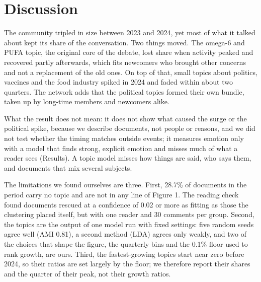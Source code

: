 \section*{Discussion}
The community tripled in size between 2023 and 2024, yet most of what it talked about kept its share of the conversation. Two things moved. The omega-6 and PUFA topic, the original core of the debate, lost share when activity peaked and recovered partly afterwards, which fits newcomers who brought other concerns and not a replacement of the old ones. On top of that, small topics about politics, vaccines and the food industry spiked in 2024 and faded within about two quarters. The network adds that the political topics formed their own bundle, taken up by long-time members and newcomers alike.

What the result does not mean: it does not show what caused the surge or the political spike, because we describe documents, not people or reasons, and we did not test whether the timing matches outside events; it measures emotion only with a model that finds strong, explicit emotion and misses much of what a reader sees (Results). A topic model misses how things are said, who says them, and documents that mix several subjects.

The limitations we found ourselves are three. First, 28.7\% of documents in the period carry no topic and are not in any line of Figure 1. The reading check found documents rescued at a confidence of 0.02 or more as fitting as those the clustering placed itself, but with one reader and 30 comments per group. Second, the topics are the output of one model run with fixed settings: five random seeds agree well (AMI 0.81), a second method (LDA) agrees only weakly, and two of the choices that shape the figure, the quarterly bins and the 0.1\% floor used to rank growth, are ours. Third, the fastest-growing topics start near zero before 2024, so their ratios are set largely by the floor; we therefore report their shares and the quarter of their peak, not their growth ratios.

